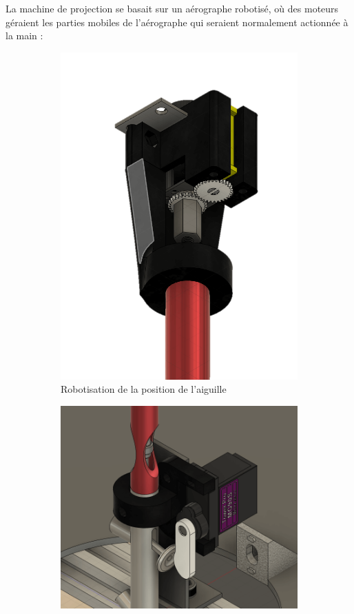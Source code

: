 \newpage
La machine de projection se basait sur un aérographe robotisé, où des moteurs géraient les parties mobiles
de l'aérographe qui seraient normalement actionnée à la main :
\begin{figure}[H]
  \centering
  \begin{subfigure}{.35\textwidth}
    \centering
    \includegraphics[width=1\linewidth]{assets/figures/situation_initiale/robotisation_aiguille.png}
    \caption{Robotisation de la position de l'aiguille}
    \label{fig:robot_aiguille}
  \end{subfigure}%
  \begin{subfigure}{.65\textwidth}
    \centering
    \includegraphics[width=.75\linewidth]{assets/figures/situation_initiale/Robotisation_projection.png}

\end{subfigure}
\end{figure}
